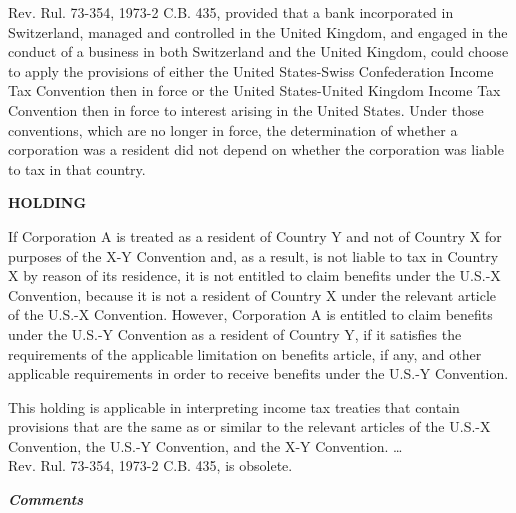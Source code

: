 \begin{select}
Rev. Rul. 73-354, 1973-2 C.B. 435, provided that a bank incorporated in Switzerland, managed and controlled in the United Kingdom, and engaged in the conduct of a business in both Switzerland and the United Kingdom, could choose to apply the provisions of either the United States-Swiss Confederation Income Tax Convention then in force or the United States-United Kingdom Income Tax Convention then in force to interest arising in the United States. Under those conventions, which are 
no longer in force, the determination of whether a corporation was a resident did not depend on whether the corporation was liable to tax in that country. 
\begin{center} \textbf{HOLDING}
\end{center} 
If Corporation A is treated as a resident of Country Y and not of Country X for purposes of the X-Y Convention and, as a result, is not liable to tax in Country X by reason of its residence, it is not entitled to claim benefits under the U.S.-X Convention, because it is not a resident of Country X under the relevant article of the U.S.-X Convention. However, Corporation A is entitled to claim benefits under the U.S.-Y Convention as a resident of Country Y, if it satisfies the requirements of the applicable limitation on benefits article, if any, and other applicable requirements in order to 
receive benefits under the U.S.-Y Convention. 

This holding is applicable in interpreting income tax treaties that contain provisions that are the same as or similar to the relevant articles of the U.S.-X Convention, the U.S.-Y Convention, and the X-Y Convention. \ldots \\
Rev. Rul. 73-354, 1973-2 C.B. 435, is obsolete. 
\end{select}

	\begin{center}
		\textbf{\emph{Comments}}
			\end{center}

